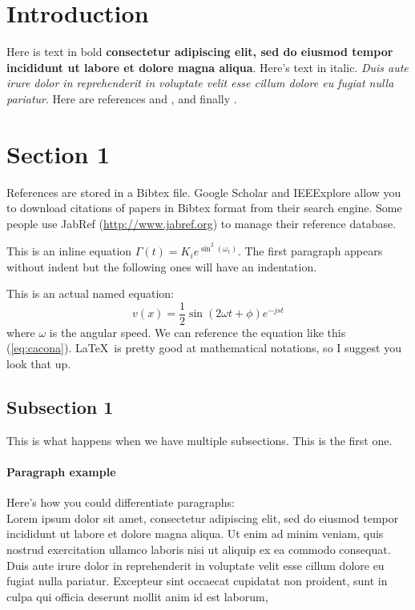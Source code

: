 \documentclass[12pt]{article}
\begin{document}
\section{Introduction}
Here is text in bold \textbf{consectetur adipiscing elit, sed do eiusmod tempor incididunt ut labore et dolore magna aliqua}. Here's text in italic. \textit{Duis aute irure dolor in reprehenderit in voluptate velit esse cillum dolore eu fugiat nulla pariatur}. Here are references \cite{zeng2010} and \cite{wang2007}, and finally \citep{harris2009}.

\section{Section 1}
References are stored in a Bibtex file. Google Scholar and IEEExplore allow you to download citations of papers in Bibtex format from their search engine. Some people use JabRef (\url{http://www.jabref.org}) to manage their reference database.

This is an inline equation $\Gamma(t)=K_i e^{\sin^2(\omega_t)}$. The first paragraph appears without indent but the following ones will have an indentation.

This is an actual named equation:
\begin{equation}
v(x)=\frac{1}{2}\sin(2 \omega t + \phi) e^{-j s t}
\label{eq:cacona}
\end{equation}
\noindent where $\omega$ is the angular speed. We can reference the equation like this (\ref{eq:cacona}). \LaTeX\ is pretty good at mathematical notations, so I suggest you look that up.



\subsection{Subsection 1}
This is what happens when we have multiple subsections. This is the first one.

\paragraph{Paragraph example}
Here's how you could differentiate paragraphs:\\
Lorem ipsum dolor sit amet, consectetur adipiscing elit, sed do eiusmod tempor incididunt ut labore et dolore magna aliqua. Ut enim ad minim veniam, quis nostrud exercitation ullamco laboris nisi ut aliquip ex ea commodo consequat. Duis aute irure dolor in reprehenderit in voluptate velit esse cillum dolore eu fugiat nulla pariatur. Excepteur sint occaecat cupidatat non proident, sunt in culpa qui officia deserunt mollit anim id est laborum, 
\end{document}
